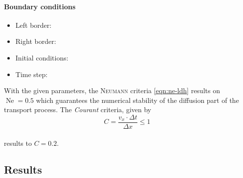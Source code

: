 \paragraph{Boundary conditions}
\begin{itemize}
	\item Left border:
	\item Right border:	
	\item Initial conditions:
	\item Time step:
\end{itemize}
With the given parameters, the \textsc{Neumann} criteria \eqref{eqn:ne-ldh} results on $\operatorname{Ne}=0.5$ which guarantees the numerical stability of the diffusion part of the transport process. The \textit{Courant} criteria, given by
\begin{equation}
	C=\frac{v_x\cdot\Delta t}{\Delta x}\leq1
	\label{eqn:addiff2}
\end{equation}\\
results to $C=0.2$.
\subsection{Results}

